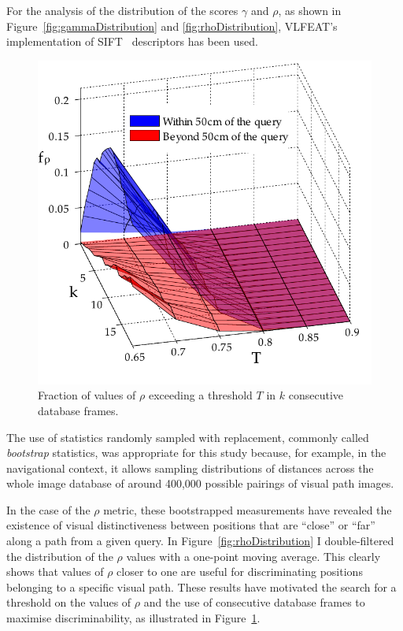 For the analysis of the distribution of the scores $\gamma$ and $\rho$, as shown in Figure~\ref{fig:gammaDistribution} and \ref{fig:rhoDistribution}, VLFEAT's~\cite{Vedaldi2008} implementation of SIFT~\cite{Lowe2004} descriptors has been used.

\begin{figure}
\begin{center}
\includegraphics[width=.8\linewidth]{./gfx/Chapter02/C1twoTestWithBootstrapping2.pdf}
\caption{Fraction of values of $\rho$ exceeding a threshold $T$ in $k$ consecutive database frames.}
\label{fig:rocTwoParametersC5}
\end{center}
\end{figure}

The use of statistics randomly sampled with replacement, commonly called \textit{bootstrap} statistics, was appropriate for this study because, for example, in the navigational context, it allows sampling distributions of distances across the whole image database of around 400,000 possible pairings of visual path images.

In the case of the $\rho$ metric, these bootstrapped measurements have revealed the existence of visual distinctiveness between positions that are ``close'' or ``far'' along a path from a given query. In Figure~\ref{fig:rhoDistribution} I double-filtered the distribution of the $\rho$ values with a one-point moving average. This clearly shows that values of $\rho$ closer to one are useful for discriminating positions belonging to a specific visual path. These results have motivated the search for a threshold on the values of $\rho$ and the use of consecutive database frames to maximise discriminability, as illustrated in Figure~\ref{fig:rocTwoParametersC5}.


